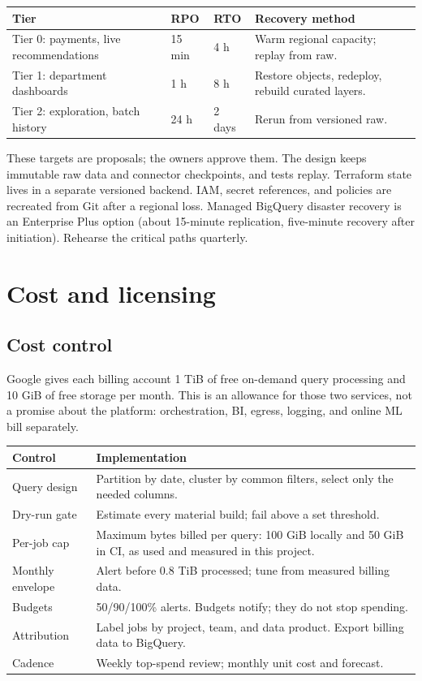 \documentclass[10pt,a4paper]{article}
\begin{document}
{\small
\begin{tabularx}{\textwidth}{L{34mm}L{20mm}L{20mm}Y}
\toprule
\textbf{Tier} & \textbf{RPO} & \textbf{RTO} & \textbf{Recovery method} \\
\midrule
Tier 0: payments, live recommendations & 15 min & 4 h & Warm regional capacity; replay from raw. \\
Tier 1: department dashboards & 1 h & 8 h & Restore objects, redeploy, rebuild curated layers. \\
Tier 2: exploration, batch history & 24 h & 2 days & Rerun from versioned raw. \\
\bottomrule
\end{tabularx}
}

These targets are proposals; the owners approve them. The design keeps
immutable raw data and connector checkpoints, and tests replay. Terraform
state lives in a separate versioned backend. IAM, secret references, and
policies are recreated from Git after a regional loss. Managed BigQuery
disaster recovery is an Enterprise Plus option (about 15-minute
replication, five-minute recovery after initiation).\cite{gcBQDR}
Rehearse the critical paths quarterly.

\section{Cost and licensing}

\subsection{Cost control}

Google gives each billing account 1 TiB of free on-demand query processing
and 10 GiB of free storage per month.\cite{gcBQPricing} This is an
allowance for those two services, not a promise about the platform:
orchestration, BI, egress, logging, and online ML bill separately.

{\small
\begin{tabularx}{\textwidth}{L{34mm}Y}
\toprule
\textbf{Control} & \textbf{Implementation} \\
\midrule
Query design & Partition by date, cluster by common filters, select only the needed columns.\cite{gcBQPartitions} \\
Dry-run gate & Estimate every material build; fail above a set threshold. \\
Per-job cap & Maximum bytes billed per query: 100 GiB locally and 50 GiB in CI, as used and measured in this project.\cite{gcBQCosts,gcBQQuotas} \\
Monthly envelope & Alert before 0.8 TiB processed; tune from measured billing data. \\
Budgets & 50/90/100\% alerts. Budgets notify; they do not stop spending.\cite{gcBudget} \\
Attribution & Label jobs by project, team, and data product. Export billing data to BigQuery. \\
Cadence & Weekly top-spend review; monthly unit cost and forecast. \\
\bottomrule
\end{tabularx}
}
\end{document}
